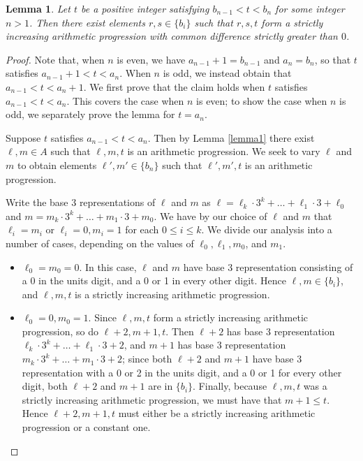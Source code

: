 \documentclass[11pt,letterpaper,twoside,english]{article}
\theoremstyle{theorem}
\newtheorem{lemma}[theorem]{Lemma}
\theoremstyle{remark}
\begin{document}
\begin{lemma} \label{lemma2}
Let $t$ be a positive integer satisfying $b_{n-1}<t<b_n$ for some integer $n>1$. Then there exist elements $r, s\in \{b_i\}$ such that $r, s, t$ form a strictly increasing arithmetic progression with common difference strictly greater than $0$.
\end{lemma}
\begin{proof}
Note that, when $n$ is even, we have $a_{n-1}+1=b_{n-1}$ and $a_n=b_n$, so that $t$ satisfies $a_{n-1}+1<t<a_n$. When $n$ is odd, we instead obtain that $a_{n-1}<t<a_n+1$. We first prove that the claim holds when $t$ satisfies $a_{n-1}<t<a_n$. This covers the case when $n$ is even; to show the case when $n$ is odd, we separately prove the lemma for $t=a_n$.

Suppose $t$ satisfies $a_{n-1}<t<a_n$. Then by Lemma \ref{lemma1} there exist $\ell, m\in A$ such that $\ell, m, t$ is an arithmetic progression. We seek to vary $\ell$ and $m$ to obtain elements $\ell', m'\in \{b_n\}$ such that $\ell', m', t$ is an arithmetic progression.

Write the base 3 representations of $\ell$ and $m$ as $\ell=\ell_k\cdot 3^k+\ldots+\ell_1\cdot 3 + \ell_0$ and $m=m_k\cdot 3^k+\ldots+m_1\cdot 3 + m_0$. We have by our choice of $\ell$ and $m$ that $\ell_i=m_i$ or $\ell_i=0,m_i=1$ for each $0\leq i \leq k$. We divide our analysis into a number of cases, depending on the values of $\ell_0, \ell_1, m_0$, and $m_1$. 
\begin{itemize}
\item $\ell_0=m_0=0$. In this case, $\ell$ and $m$ have base 3 representation consisting of a 0 in the units digit, and a 0 or 1 in every other digit. Hence $\ell, m\in \{b_i\}$, and $\ell, m, t$ is a strictly increasing arithmetic progression.
\item $\ell_0=0, m_0=1$. Since $\ell, m, t$ form a strictly increasing arithmetic progression, so do $\ell+2, m+1, t$. Then $\ell+2$ has base 3 representation $\ell_k\cdot 3^k+\ldots+\ell_1\cdot 3 + 2$, and $m+1$ has base 3 representation $m_k\cdot 3^k+\ldots + m_1\cdot 3 + 2$; since both $\ell+2$ and $m+1$ have base 3 representation with a 0 or 2 in the units digit, and a 0 or 1 for every other digit, both $\ell+2$ and $m+1$ are in $\{b_i\}$. Finally, because $\ell, m, t$ was a strictly increasing arithmetic progression, we must have that $m+1\leq t$. Hence $\ell+2, m+1, t$ must either be a strictly increasing arithmetic progression or a constant one.


\end{itemize}
\end{proof}
\end{document}
